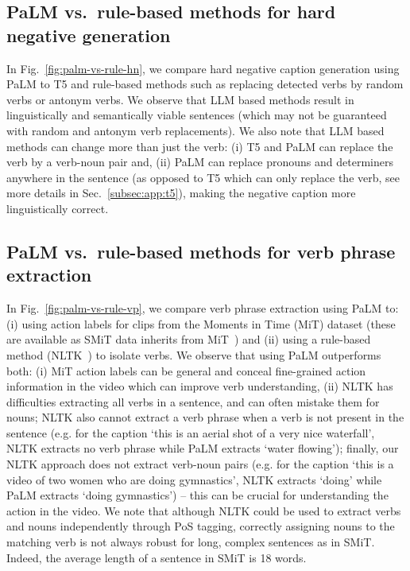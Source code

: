 \subsection{PaLM vs.~rule-based methods for hard negative generation}\label{sec:app:palm-comparison-neg}
In Fig.~\ref{fig:palm-vs-rule-hn}, we compare hard negative caption generation using PaLM to T5 and rule-based methods such as replacing detected verbs by random verbs or antonym verbs. We observe that LLM based methods result in linguistically and semantically viable sentences (which may not be guaranteed with random and antonym verb replacements). We also note that LLM based methods can change more than just the verb: (i) T5 and PaLM can replace the verb by a verb-noun pair and, (ii) PaLM can replace pronouns and determiners anywhere in the sentence (as opposed to T5 which can only replace the verb, see more details in Sec.~\ref{subsec:app:t5}), making the negative caption more linguistically correct.





\subsection{PaLM vs.~rule-based methods for verb phrase extraction}\label{sec:app:palm-comparison-vp}
In Fig.~\ref{fig:palm-vs-rule-vp}, we compare verb phrase extraction using PaLM to:
(i) using action labels for clips from the Moments in Time (MiT) dataset (these are available as SMiT data inherits from MiT~\cite{monfortmoments}) and
(ii) using a rule-based method (NLTK~\cite{bird2009natural}) to isolate verbs. 
We observe that using PaLM outperforms both: (i) MiT action labels can be general and conceal fine-grained action information in the video which can improve verb understanding, (ii) NLTK has difficulties extracting all verbs in a sentence, and can often mistake them for nouns; NLTK also cannot extract a verb phrase when a verb is not present in the sentence (e.g. for the caption `this is an aerial shot of a very nice waterfall', NLTK extracts no verb phrase while PaLM extracts `water flowing'); finally, our NLTK approach does not extract verb-noun pairs (e.g. for the caption `this is a video of two women who are doing gymnastics', NLTK extracts `doing' while PaLM extracts `doing gymnastics') -- this can be crucial for understanding the action in the video. We note that although NLTK could be used to extract verbs and nouns independently through PoS tagging, correctly assigning nouns to the matching verb is not always robust for long, complex sentences as in SMiT. Indeed, the average length of a sentence in SMiT is 18 words. 

